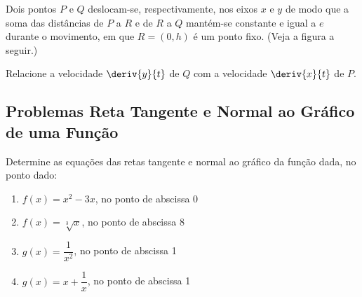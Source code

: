 \begin{exercicio}[21]
Dois pontos $P$ e $Q$ deslocam-se, respectivamente, nos eixos $x$ e $y$ de modo que a soma das distâncias de $P$ a $R$ e de $R$ a $Q$ mantém-se constante e igual a $e$ durante o movimento, em que $R = (0, h)$ é um ponto fixo. (Veja a figura a seguir.)

\begin{center}
\end{center}

Relacione a velocidade $\deriv{y}{t}$ de $Q$ com a velocidade $\deriv{x}{t}$ de $P$.
\end{exercicio}

\clearpage

\subsection{Problemas Reta Tangente e Normal ao Gráfico de uma Função}

\begin{exercicio}[1]
Determine as equações das retas tangente e normal ao gráfico da função dada, no ponto dado:
\begin{enumerate}[label=\alph*)]
    \item $f(x) = x^2 - 3x$, no ponto de abscissa 0
    \item $f(x) = \sqrt[3]{x}$, no ponto de abscissa 8
    \item $g(x) = \dfrac{1}{x^2}$, no ponto de abscissa 1
    \item $g(x) = x + \dfrac{1}{x}$, no ponto de abscissa 1
\end{enumerate}
\end{exercicio}

